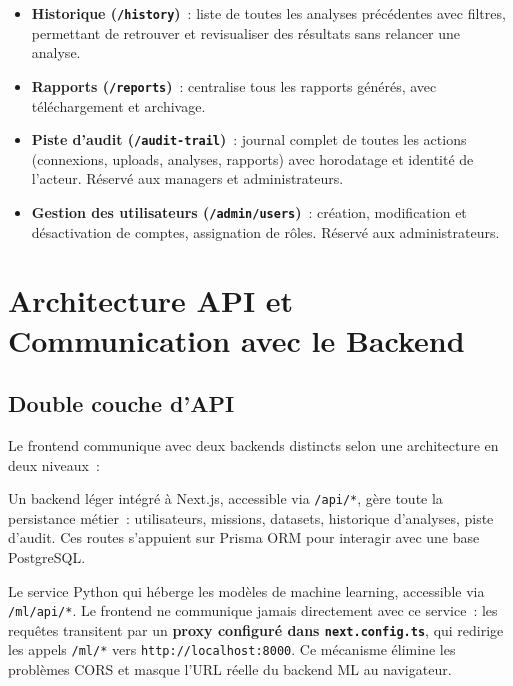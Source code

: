 \begin{itemize}[leftmargin=1.5em]
  \item \textbf{Historique (\texttt{/history})}~: liste de toutes les analyses précédentes avec filtres, permettant de retrouver et revisualiser des résultats sans relancer une analyse.
  \item \textbf{Rapports (\texttt{/reports})}~: centralise tous les rapports générés, avec téléchargement et archivage.
  \item \textbf{Piste d'audit (\texttt{/audit-trail})}~: journal complet de toutes les actions (connexions, uploads, analyses, rapports) avec horodatage et identité de l'acteur. Réservé aux managers et administrateurs.
  \item \textbf{Gestion des utilisateurs (\texttt{/admin/users})}~: création, modification et désactivation de comptes, assignation de rôles. Réservé aux administrateurs.
\end{itemize}

\section{Architecture API et Communication avec le Backend}

\subsection{Double couche d'API}

Le frontend communique avec deux backends distincts selon une architecture en deux niveaux~:

\begin{description}[leftmargin=1.5em, style=nextline]
  \item[Couche 1 --- Next.js API Routes (PostgreSQL)]
    Un backend léger intégré à Next.js, accessible via \texttt{/api/*}, gère toute la persistance métier~: utilisateurs, missions, datasets, historique d'analyses, piste d'audit. Ces routes s'appuient sur Prisma ORM pour interagir avec une base PostgreSQL.

  \item[Couche 2 --- FastAPI ML Backend]
    Le service Python qui héberge les modèles de machine learning, accessible via \texttt{/ml/api/*}. Le frontend ne communique jamais directement avec ce service~: les requêtes transitent par un \textbf{proxy configuré dans \texttt{next.config.ts}}, qui redirige les appels \texttt{/ml/*} vers \texttt{http://localhost:8000}. Ce mécanisme élimine les problèmes CORS et masque l'URL réelle du backend ML au navigateur.
\end{description}


